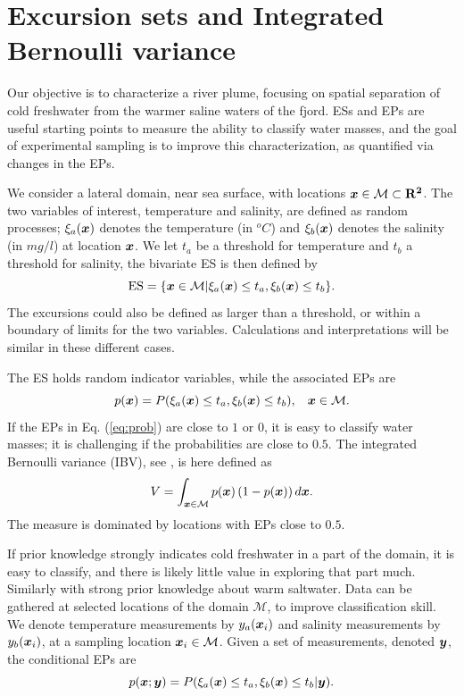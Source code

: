 \documentclass[aoas]{imsart}
\begin{document}


\section{Excursion sets and Integrated Bernoulli variance}
\label{sec:ESEP}

Our objective is to characterize a river plume, focusing on spatial
separation of cold freshwater from the warmer saline waters of the
fjord. ESs and EPs are useful starting points to measure the ability
to classify water masses, and the goal of experimental sampling is to
improve this characterization, as quantified via changes in the EPs.

We consider a lateral domain, near sea surface, with locations
${\boldsymbol x} \in \mathcal{M} \subset \mathbf{R^2}$. The two variables of
interest, temperature and salinity, are defined as random processes;
$\xi_a({\boldsymbol x})$ denotes the temperature (in $^o C$) and $\xi_b({\boldsymbol x})$
denotes the salinity (in $mg/l$) at location ${\boldsymbol x}$.  We let $t_a$ be a
threshold for temperature and $t_b$ a threshold for salinity, the
bivariate ES is then defined by
 \begin{equation}\label{ES}
     \mbox{ES} = \{\bx \in \mathcal{M} | \xi_a(\bx) \leq t_a,\xi_b(\bx) \leq t_b\}.
 \end{equation}
 The excursions could also be defined as larger than a threshold, or
 within a boundary of limits for the two variables. Calculations and
 interpretations will be similar in these different cases.

The ES holds random indicator variables, while the associated EPs are 
\begin{equation}\label{eq:prob}
 p(\bx) = P(\xi_a(\bx) \leq t_a, \xi_b(\bx) \leq t_b), \hspace{3mm} \bx \in \mathcal{M}.
\end{equation}
If the EPs in Eq. (\ref{eq:prob}) are
close to $1$ or $0$, it is easy to classify water masses; it is
challenging if the probabilities are close to $0.5$. 
The integrated Bernoulli variance (IBV), see \cite{bect2019}, is here defined as 
\begin{equation}\label{measVAR}
    V = \int_{\bx \in \mathcal{M}} p(\bx) \left(1-p(\bx)\right) d\bx.
\end{equation}
The measure is dominated by locations with EPs close to $0.5$.

If prior knowledge strongly indicates cold freshwater in a part of the domain, it is easy to classify, and there is likely little value in exploring that part much. Similarly with strong prior knowledge about warm saltwater. 
Data can be gathered at selected locations of the domain $\mathcal{M}$, to improve classification skill. We denote temperature measurements by $y_{a}({\boldsymbol x}_i)$ and salinity measurements by $y_{b}({\boldsymbol x}_i)$, at a sampling location ${\boldsymbol x}_i \in \mathcal{M}$. Given a set of measurements, denoted ${\boldsymbol y}$, the conditional EPs are
\begin{equation}\label{eq:post_ep}
 p(\bx;\by) = P(\xi_a(\bx) \leq t_a, \xi_b(\bx) \leq t_b |\by). 
\end{equation}
\end{document}
